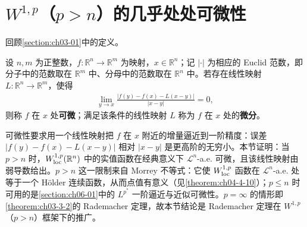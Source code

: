 \documentclass[../../main.tex]{subfiles}%
\begin{document}
\section{$W^{1,p}$（$p>n$）的几乎处处可微性}\label{section:ch06-02}

回顾\cref{section:ch03-01}中的定义。%

\begin{definition}[可微性]\label{definition:ch06-6-2}
设 $n,m$ 为正整数，$f:\mathbb{R}^n\to\mathbb{R}^m$ 为映射，$x\in\mathbb{R}^n$；记 $\lvert\cdot\rvert$ 为相应的 Euclid 范数，即分子中的范数取在 $\mathbb{R}^m$ 中、分母中的范数取在 $\mathbb{R}^n$ 中。若存在线性映射 $L:\mathbb{R}^n\to\mathbb{R}^m$，使得
\begin{align*}
\lim_{y\to x}\frac{\lvert f(y)-f(x)-L(x-y)\rvert}{\lvert x-y\rvert}=0,
\end{align*}
则称 $f$ 在 $x$ 处\textbf{可微}；满足该条件的线性映射 $L$ 称为 $f$ 在 $x$ 处的\textbf{微分}。
\end{definition}

\begin{remark}\label{remark:ch06-def-6-2-动机}
可微性要求用一个线性映射把 $f$ 在 $x$ 附近的增量逼近到一阶精度：误差 $\lvert f(y)-f(x)-L(x-y)\rvert$ 相对 $\lvert x-y\rvert$ 是更高阶的无穷小。本节证明：当 $p>n$ 时，$W^{1,p}_{\mathrm{loc}}(\mathbb{R}^n)$ 中的实值函数在经典意义下 $\mathcal{L}^{n}$-a.e. 可微，且该线性映射由弱导数给出。$p>n$ 这一限制来自 Morrey 不等式：它使 $W^{1,p}_{\mathrm{loc}}$ 函数在 $\mathcal{L}^{n}$-a.e. 处等于一个 Hölder 连续函数，从而点值有意义（见\cref{theorem:ch04-4-10}）；$p\leqslant n$ 时可用的是\cref{section:ch06-01}中的 $L^{p^{*}}$ 一阶逼近与近似可微性。$p=\infty$ 的情形即\cref{theorem:ch03-3-2}的 Rademacher 定理，故本节结论是 Rademacher 定理在 $W^{1,p}$（$p>n$）框架下的推广。%
\end{remark}
\end{document}
